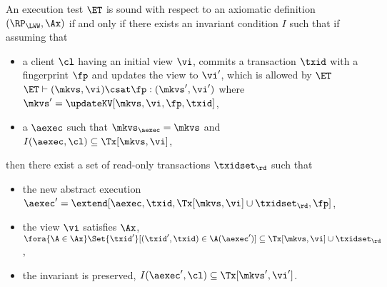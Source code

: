 \begin{definition}
\label{def:et_sound}
An execution test \(\ET\) is sound with respect to an axiomatic 
definition \((\RP_{\LWW}, \Ax)\) if and only if
there exists an invariant condition \(I\) such that 
if assuming that
\begin{itemize}
    \item a client \( \cl \) having an initial view \( \vi \), 
        commits a transaction \( \txid \) with a fingerprint \( \fp \) and updates the view to \( \vi' \), 
        which is allowed by \( \ET \) \ie \(\ET \vdash (\mkvs, \vi) \csat \fp: (\mkvs',\vi')\) where \( \mkvs' = \updateKV[\mkvs, \vi ,\fp, \txid]\),
    \item a \(\aexec\) such that \(\mkvs_{\aexec} = \mkvs\) and \(I(\aexec, \cl) \subseteq \Tx[\mkvs, \vi]\),
\end{itemize}
then there exist a set of read-only transactions \(\txidset_{\rd}\) such that 
\begin{itemize}
    \item the new abstract execution \( \aexec'  = \extend[\aexec,\txid,\Tx[\mkvs,\vi] \cup \txidset_\rd, \fp]\),
    \item the view \( \vi \) satisfies \( \Ax \), \ie \(\fora{ \A \in \Ax } \Set{\txid' }[ (\txid', \txid) \in \A(\aexec')] \subseteq \Tx[\mkvs, \vi] \cup \txidset_{\rd}\), 
    \item the invariant is preserved, \ie \(I(\aexec', \cl) \subseteq \Tx[\mkvs', \vi']\).
\end{itemize}
\end{definition}

